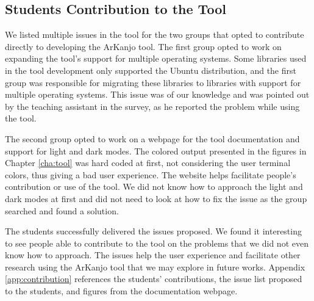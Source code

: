 \subsection{Students Contribution to the Tool}

We listed multiple issues in the tool for the two groups that opted to contribute directly 
to developing the ArKanjo tool. The first group opted to work on expanding the tool's support 
for multiple operating systems. Some libraries used in the tool development only supported the 
Ubuntu distribution, and the first group was responsible for migrating these libraries to 
libraries with support for multiple operating systems. This issue was of our knowledge and 
was pointed out by the teaching assistant in the survey, as he reported the problem while 
using the tool.

The second group opted to work on a webpage for the tool documentation and support for 
light and dark modes. The colored output presented in the figures in Chapter \ref{cha:tool} was 
hard coded at first, not considering the user terminal colors, thus giving a bad user experience. 
The website helps facilitate people's contribution or use of the tool. We did not know how to 
approach the light and dark modes at first and did not need to look at how to fix the issue as 
the group searched and found a solution.

The students successfully delivered the issues proposed. We found it interesting to see 
people able to contribute to the tool on the problems that we did not even know how to approach.
The issues help the user experience and facilitate other research using the ArKanjo tool that 
we may explore in future works. Appendix \ref{app:contribution} references the 
students' contributions, the issue list proposed to the students, and figures from 
the documentation webpage.

